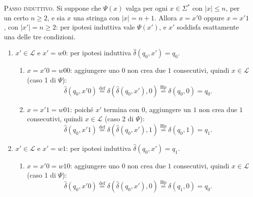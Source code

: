 \documentclass[a4paper, 11pt, oneside]{book}
\theoremstyle{formale}
\begin{document}
    \textsc{Passo induttivo}. Si suppone che $\Psi(x)$ valga per ogni $x \in \Sigma^*$ con
    $|x| \leq n$, per un certo $n \geq 2$, e sia $x$ una stringa con $|x| = n + 1$. Allora
    $x = x'0$ oppure $x = x'1$, con $|x'| = n \geq 2$: per ipotesi induttiva vale
    $\Psi(x')$, e $x'$ soddisfa esattamente una delle tre condizioni.
    \begin{enumerate}
        \item $x' \in \mathcal{L}$ e $x' = w0$: per ipotesi induttiva
            $\hat{\delta}(q_0, x') = q_0$.
            \begin{enumerate}[label=\arabic{enumi}\alph*.]
                \item $x = x'0 = w00$: aggiungere uno $0$ non crea due $1$ consecutivi,
                    quindi $x \in \mathcal{L}$ (caso 1 di $\Psi$):
                    \begin{equation*}
                        \hat{\delta}(q_0, x'0)
                        \overset{\text{def}}{=} \delta(\hat{\delta}(q_0, x'), 0)
                        \overset{\text{Hp}}{=} \delta(q_0, 0) = q_0.
                    \end{equation*}
                \item $x = x'1 = w01$: poich\'e $x'$ termina con $0$, aggiungere un $1$ non
                    crea due $1$ consecutivi, quindi $x \in \mathcal{L}$ (caso 2 di $\Psi$):
                    \begin{equation*}
                        \hat{\delta}(q_0, x'1)
                        \overset{\text{def}}{=} \delta(\hat{\delta}(q_0, x'), 1)
                        \overset{\text{Hp}}{=} \delta(q_0, 1) = q_1.
                    \end{equation*}
            \end{enumerate}
        \item $x' \in \mathcal{L}$ e $x' = w1$: per ipotesi induttiva
            $\hat{\delta}(q_0, x') = q_1$.
            \begin{enumerate}[label=\arabic{enumi}\alph*.]
                \item $x = x'0 = w10$: aggiungere uno $0$ non crea due $1$ consecutivi,
                    quindi $x \in \mathcal{L}$ (caso 1 di $\Psi$):
                    \begin{equation*}
                        \hat{\delta}(q_0, x'0)
                        \overset{\text{def}}{=} \delta(\hat{\delta}(q_0, x'), 0)
                        \overset{\text{Hp}}{=} \delta(q_1, 0) = q_0.
                    \end{equation*}

\end{enumerate}
\end{enumerate}
\end{document}
